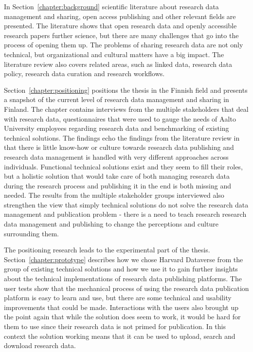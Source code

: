 In Section~\ref{chapter:background} scientific literature about research data
management and sharing, open access publishing and other relevant fields are
presented. The literature shows that open research data and openly accessible
research papers further science, but there are many challenges that go into
the process of opening them up. The problems of sharing research data are not
only technical, but organizational and cultural matters have a big impact. The
literature review also covers related areas, such as linked data, research
data policy, research data curation and research workflows.

Section~\ref{chapter:positioning} positions the thesis in the Finnish field and
presents a snapshot of the current level of research data management and
sharing in Finland. The chapter contains interviews from the multiple
stakeholders that deal with research data, questionnaires that were used to
gauge the needs of Aalto University employees regarding research data and
benchmarking of existing technical solutions. The findings echo the findings from the
literature review in that there is little know-how or culture towards research
data publishing and research data management is handled with very different
approaches across individuals. Functional technical solutions exist and they
seem to fill their roles, but a holistic solution that would take care of both
managing research data during the research process and publishing it in the end
is both missing and needed. The results from the multiple stakeholder groups
interviewed also strengthen the view that simply technical solutions do not
solve the research data management and publication problem - there is a need to
teach research research data management and publishing to change the perceptions
and culture surrounding them.

The positioning research leads to the experimental part of the thesis. Section~\ref{chapter:prototype} describes how we chose Harvard Dataverse from the
group of existing technical solutions and how we use it to gain further insights about
the technical implementations of research data publishing platforms. The user tests
show that the mechanical process of using the research data publication
platform is easy to learn and use, but there are some technical and usability
improvements that could be made. Interactions with the users also brought up
the point again that while the solution does seem to work, it would be hard
for them to use since their research data is not primed for publication. In
this context the solution working means that it can be used to upload, search
and download research data.

